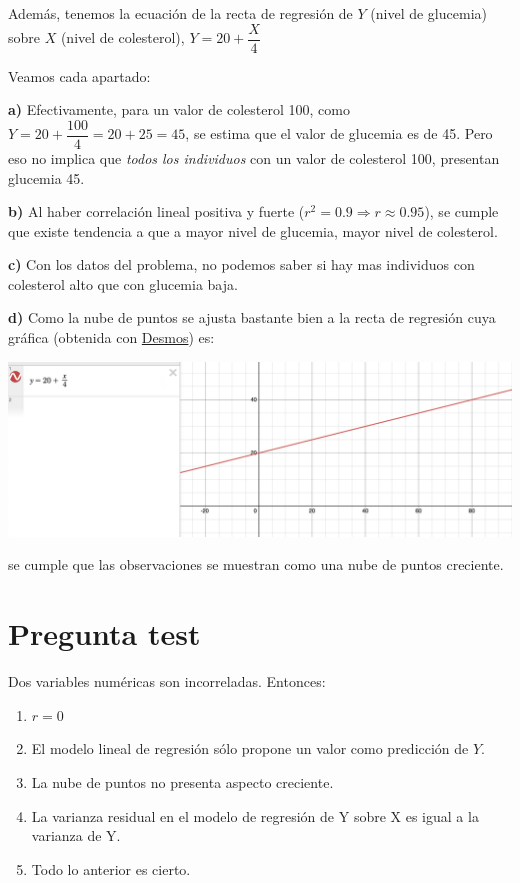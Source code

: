 \documentclass[
]{book}
\providecommand{\tightlist}{%
  \setlength{\itemsep}{0pt}\setlength{\parskip}{0pt}}
\begin{document}
Además, tenemos la ecuación de la recta de regresión de \(Y\) (nivel de glucemia) sobre \(X\) (nivel de colesterol), \(Y=20 + \dfrac{X}{4}\)

Veamos cada apartado:

\textbf{a)} Efectivamente, para un valor de colesterol 100, como \(Y=20 + \dfrac{100}{4}= 20 + 25 = 45\), se estima que el valor de glucemia es de 45. Pero eso no implica que \emph{todos los individuos} con un valor de colesterol 100, presentan glucemia 45.

\textbf{b)} Al haber correlación lineal positiva y fuerte (\(r^2=0.9 \Rightarrow r \approx 0.95\)), se cumple que existe tendencia a que a mayor nivel de glucemia, mayor nivel de colesterol.

\textbf{c)} Con los datos del problema, no podemos saber si hay mas individuos con colesterol alto que con glucemia baja.

\textbf{d)} Como la nube de puntos se ajusta bastante bien a la recta de regresión cuya gráfica (obtenida con \href{https://www.desmos.com/calculator?lang=es}{Desmos}) es:

\includegraphics[width=26.42in]{img/4_1}

se cumple que las observaciones se muestran como una nube de puntos creciente.

\hypertarget{pregunta-test-113}{%
\section{Pregunta test}\label{pregunta-test-113}}

Dos variables numéricas son incorreladas. Entonces:

\begin{enumerate}
\def\labelenumi{\alph{enumi})}
\tightlist
\item
  \(r = 0\)
\item
  El modelo lineal de regresión sólo propone un valor como predicción de \(Y\).
\item
  La nube de puntos no presenta aspecto creciente.
\item
  La varianza residual en el modelo de regresión de Y sobre X es igual a la varianza de Y.
\item
  Todo lo anterior es cierto.
\end{enumerate}
\end{document}
